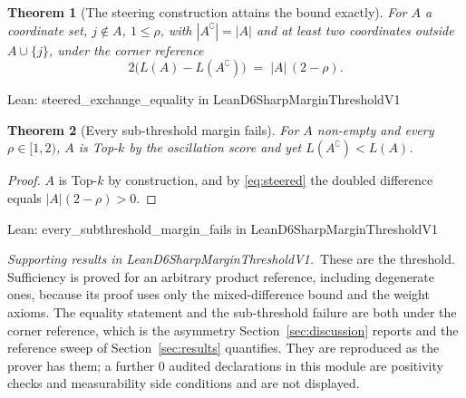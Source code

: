 \documentclass[conference]{IEEEtran}
\newtheorem{theorem}{Theorem}
\theoremstyle{definition}
\newcommand{\lean}[1]{\textsf{\footnotesize #1}}
\newcommand{\leanbox}[1]{%
  \par\vspace{2pt}\noindent
  {\footnotesize\textsf{Lean: #1}}\par\vspace{2pt}}
\begin{document}
\begin{theorem}[The steering construction attains the bound exactly]
\label{thm:steered}
For $A$ a coordinate set, $j\notin A$, $1\le\rho$, with $|A^{\complement}|=|A|$ and at least
two coordinates outside $A\cup\{j\}$, under the corner reference
\begin{equation}
2\bigl(L(A)-L(A^{\complement})\bigr)\;=\;|A|\,(2-\rho).
\label{eq:steered}
\end{equation}
\end{theorem}

\leanbox{\lean{steered\_exchange\_equality} in \lean{LeanD6SharpMarginThresholdV1}}

\begin{theorem}[Every sub-threshold margin fails]
\label{thm:subthreshold}
For $A$ non-empty and every $\rho\in[1,2)$, $A$ is Top-$k$ by the oscillation score and yet
$L(A^{\complement})<L(A)$.
\end{theorem}

\begin{proof}
$A$ is Top-$k$ by construction, and by \eqref{eq:steered} the doubled difference equals
$|A|(2-\rho)>0$.
\end{proof}

\leanbox{\lean{every\_subthreshold\_margin\_fails} in
\lean{LeanD6SharpMarginThresholdV1}}

\noindent\emph{Supporting results in \lean{LeanD6SharpMarginThresholdV1}.}~These are the threshold. Sufficiency is proved for an arbitrary product reference, including degenerate ones, because its proof uses only the mixed-difference bound and the weight axioms. The equality statement and the sub-threshold failure are both under the corner reference, which is the asymmetry Section~\ref{sec:discussion} reports and the reference sweep of Section~\ref{sec:results} quantifies. They are reproduced as the prover has them; a further $0$ audited declarations in this module are positivity checks and measurability side conditions and are not displayed.
\end{document}

